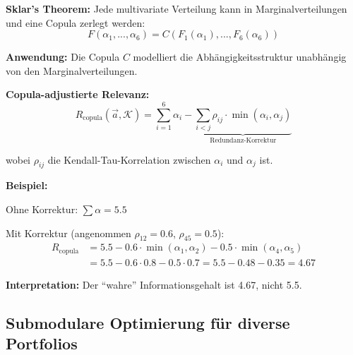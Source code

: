 \begin{tcolorbox}[colback=green!5!white, colframe=green!75!black,
    title=\textbf{Lösung: Copula-basierte Relevanz}]

\textbf{Sklar's Theorem:} Jede multivariate Verteilung kann in Marginalverteilungen und eine Copula zerlegt werden:
\begin{equation}
F(\alpha_1, ..., \alpha_6) = C(F_1(\alpha_1), ..., F_6(\alpha_6))
\end{equation}

\textbf{Anwendung:} Die Copula $C$ modelliert die Abhängigkeitsstruktur unabhängig von den Marginalverteilungen.

\textbf{Copula-adjustierte Relevanz:}
\begin{equation}
R_{\text{copula}}(\vec{a}, \mathcal{K}) = \sum_{i=1}^{6} \alpha_i - \underbrace{\sum_{i < j} \rho_{ij} \cdot \min(\alpha_i, \alpha_j)}_{\text{Redundanz-Korrektur}}
\end{equation}

wobei $\rho_{ij}$ die Kendall-Tau-Korrelation zwischen $\alpha_i$ und $\alpha_j$ ist.

\textbf{Beispiel:}

Ohne Korrektur: $\sum \alpha = 5.5$

Mit Korrektur (angenommen $\rho_{12} = 0.6$, $\rho_{45} = 0.5$):
\begin{align*}
R_{\text{copula}} &= 5.5 - 0.6 \cdot \min(\alpha_1, \alpha_2) - 0.5 \cdot \min(\alpha_4, \alpha_5) \\
&= 5.5 - 0.6 \cdot 0.8 - 0.5 \cdot 0.7 = 5.5 - 0.48 - 0.35 = \mathbf{4.67}
\end{align*}

\textbf{Interpretation:} Der ``wahre'' Informationsgehalt ist 4.67, nicht 5.5.

\end{tcolorbox}

\subsection{Submodulare Optimierung für diverse Portfolios}

